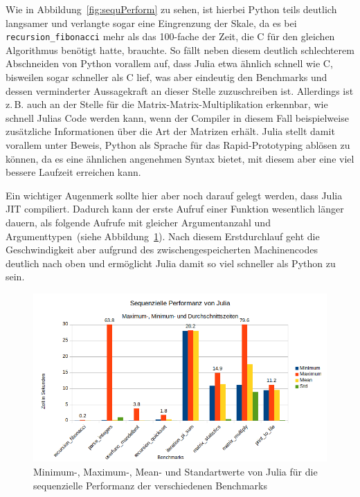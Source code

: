 \documentclass[proseminar,german,utf8]{zihpub}
\newcommand{\zB}[0]{{z.\,B. }}
\begin{document}
Wie in Abbildung~\ref{fig:sequPerform} zu sehen, ist hierbei Python teils deutlich langsamer und verlangte sogar eine Eingrenzung der Skale, da es bei \verb|recursion_fibonacci| mehr als das 100-fache der Zeit, die C für den gleichen Algorithmus benötigt hatte, brauchte. So fällt neben diesem deutlich schlechterem Abschneiden von Python vorallem auf, dass Julia etwa ähnlich schnell wie C,  bisweilen sogar schneller als C lief, was aber eindeutig den Benchmarks und dessen verminderter Aussagekraft an dieser Stelle zuzuschreiben ist. Allerdings ist \zB auch an der Stelle für die Matrix-Matrix-Multiplikation erkennbar, wie schnell Julias Code werden kann, wenn der Compiler in diesem Fall beispielweise zusätzliche Informationen über die Art der Matrizen erhält. Julia stellt damit vorallem unter Beweis, Python als Sprache für das Rapid-Prototyping ablösen zu können, da es eine ähnlichen angenehmen Syntax bietet, mit diesem aber eine viel bessere Laufzeit erreichen kann. 

Ein wichtiger Augenmerk sollte hier aber noch darauf gelegt werden, dass Julia JIT compiliert. Dadurch kann der erste Aufruf einer Funktion wesentlich länger dauern, als folgende Aufrufe mit gleicher Argumentanzahl und Argumenttypen~(siehe Abbildung~\ref{fig:juliaPerform}). Nach diesem Erstdurchlauf geht die Geschwindigkeit aber aufgrund des zwischengespeicherten Machinencodes deutlich nach oben und ermöglicht Julia damit so viel schneller als Python zu sein.

\begin{figure}[hbt!]
  \centering
  \includegraphics[scale=0.8]{bilder/julia_performance.png}
  \caption{Minimum-, Maximum-, Mean- und Standartwerte von Julia für die sequenzielle Performanz der verschiedenen Benchmarks }
  \label{fig:juliaPerform}
\end{figure}
\end{document}
